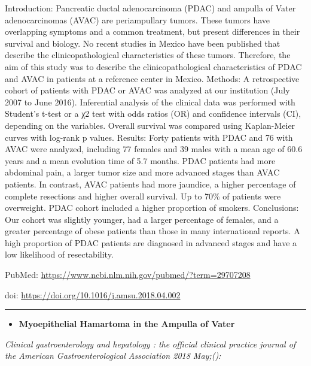 \documentclass[]{article}
\providecommand{\tightlist}{%
  \setlength{\itemsep}{0pt}\setlength{\parskip}{0pt}}
\begin{document}
Introduction: Pancreatic ductal adenocarcinoma (PDAC) and ampulla of
Vater adenocarcinomas (AVAC) are periampullary tumors. These tumors have
overlapping symptoms and a common treatment, but present differences in
their survival and biology. No recent studies in Mexico have been
published that describe the clinicopathological characteristics of these
tumors. Therefore, the aim of this study was to describe the
clinicopathological characteristics of PDAC and AVAC in patients at a
reference center in Mexico. Methods: A retrospective cohort of patients
with PDAC or AVAC was analyzed at our institution (July 2007 to June
2016). Inferential analysis of the clinical data was performed with
Student's t-test or a χ2 test with odds ratios (OR) and confidence
intervals (CI), depending on the variables. Overall survival was
compared using Kaplan-Meier curves with log-rank p values. Results:
Forty patients with PDAC and 76 with AVAC were analyzed, including 77
females and 39 males with a mean age of 60.6 years and a mean evolution
time of 5.7 months. PDAC patients had more abdominal pain, a larger
tumor size and more advanced stages than AVAC patients. In contrast,
AVAC patients had more jaundice, a higher percentage of complete
resections and higher overall survival. Up to 70\% of patients were
overweight. PDAC cohort included a higher proportion of smokers.
Conclusions: Our cohort was slightly younger, had a larger percentage of
females, and a greater percentage of obese patients than those in many
international reports. A high proportion of PDAC patients are diagnosed
in advanced stages and have a low likelihood of resectability.

PubMed: \url{https://www.ncbi.nlm.nih.gov/pubmed/?term=29707208}

doi: \url{https://doi.org/10.1016/j.amsu.2018.04.002}

{}

{}

\begin{center}\rule{0.5\linewidth}{\linethickness}\end{center}

\begin{itemize}
\tightlist
\item
  \textbf{Myoepithelial Hamartoma in the Ampulla of Vater}
\end{itemize}

\emph{Clinical gastroenterology and hepatology : the official clinical
practice journal of the American Gastroenterological Association 2018
May;():}
\end{document}
